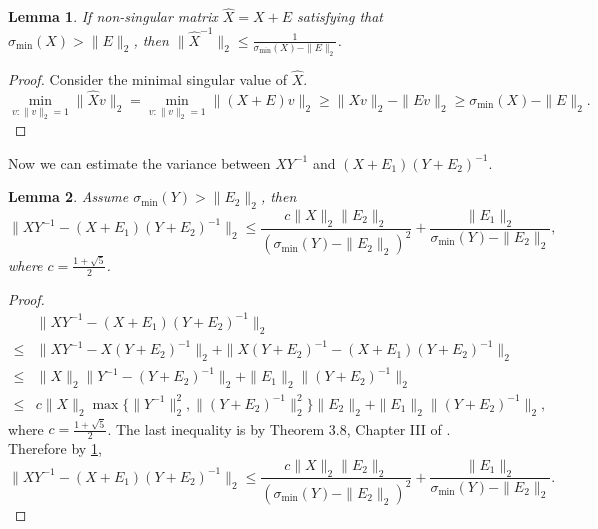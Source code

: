 \documentclass[english]{article} %
\newtheorem{lemma}{Lemma}[section]
\theoremstyle{definition}
\begin{document}
\begin{lemma}
\label{lem:inversevariation}
If non-singular matrix $\widehat{X} = X+E$ satisfying that $\sigma_{\min}(X)>\|E\|_2$, then  $\|\widehat{X}^{-1}\|_2 \le \frac{1}{\sigma_{\min}(X)-\|E\|_2}$.
\end{lemma} 
\begin{proof}
Consider the minimal singular value of $\widehat{X}$. 
\[
 \min_{v:\|v\|_2=1} \|\widehat{X}v\|_2 = \min_{v:\|v\|_2=1}\|(X+E)v\|_2 \ge \|Xv\|_2 - \|Ev\|_2 \ge \sigma_{\min}(X) - \|E\|_2.
\]
\end{proof}

Now we can estimate the variance between $XY^{-1}$ and $(X+E_1)(Y+E_2)^{-1}$.
\begin{lemma}
\label{lem:Mvariation}
Assume $\sigma_{\min}(Y) > \|E_2\|_2$, then 
\[
\| XY^{-1} - (X+E_1)(Y+E_2)^{-1}\|_2 \le \frac{c\|X\|_2\|E_2\|_2}{(\sigma_{\min}(Y) - \|E_2\|_2)^2}+\frac{\|E_1\|_2}{\sigma_{\min}(Y) - \|E_2\|_2},
\]
where $c = \frac{1+\sqrt{5}}{2}$.
\end{lemma}
\begin{proof}

\begin{align*}
	& \| XY^{-1} - (X+E_1)(Y+E_2)^{-1}\|_2 \\
\le & \| XY^{-1} - X(Y+E_2)^{-1}\|_2 + \| X(Y+E_2)^{-1} - (X+E_1)(Y+E_2)^{-1}\|_2 \\
\le & \|X\|_2\| Y^{-1} - (Y+E_2)^{-1}\|_2 + \| E_1\|_2 \|(Y+E_2)^{-1}\|_2 \\
\le & c \|X\|_2 \max\{\| Y^{-1}\|^2_2 , \|(Y+E_2)^{-1}\|^2_2\} \|E_2\|_2 + \| E_1\|_2 \|(Y+E_2)^{-1}\|_2,
\end{align*}
where $c = \frac{1+\sqrt{5}}{2}$. The last inequality is by Theorem 3.8, Chapter III of \citep*{stewart1990matrix}. Therefore by \cref{lem:inversevariation},
\[
\| XY^{-1} - (X+E_1)(Y+E_2)^{-1}\|_2 \le \frac{c\|X\|_2\|E_2\|_2}{(\sigma_{\min}(Y) - \|E_2\|_2)^2}+\frac{\|E_1\|_2}{\sigma_{\min}(Y) - \|E_2\|_2}.
\]
\end{proof}
\end{document}
